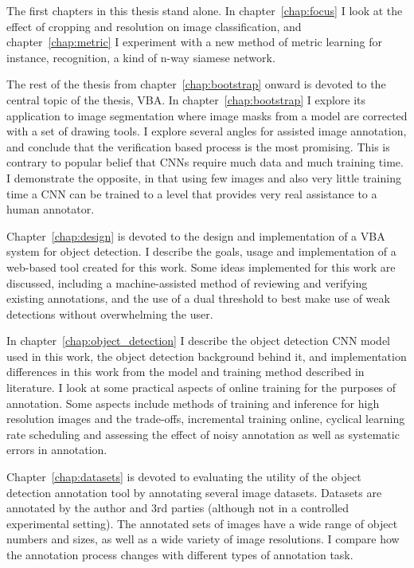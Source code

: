 The first chapters in this thesis stand alone. In chapter~\ref{chap:focus} I look at the effect of cropping and resolution on image classification, and chapter~\ref{chap:metric} I experiment with a new method of metric learning for instance, recognition, a kind of n-way siamese network. 

The rest of the thesis from chapter~\ref{chap:bootstrap} onward is devoted to the central topic of the thesis, \gls{VBA}. In chapter~\ref{chap:bootstrap} I explore its application to image segmentation where image masks from a model are corrected with a set of drawing tools. I explore several angles for assisted image annotation, and conclude that the verification based process is the most promising. This is contrary to popular belief that \gls{CNN}s require much data and much training time. I demonstrate the opposite, in that using few images and also very little training time a \gls{CNN} can be trained to a level that provides very real assistance to a human annotator. 

Chapter~\ref{chap:design} is devoted to the design and implementation of a \gls{VBA} system for object detection. I describe the goals, usage and implementation of a web-based tool created for this work. Some ideas implemented for this work are discussed, including a machine-assisted method of reviewing and verifying existing annotations, and the use of a dual threshold to best make use of weak detections without overwhelming the user.

In chapter~\ref{chap:object_detection} I describe the object detection \gls{CNN} model used in this work, the object detection background behind it, and implementation differences in this work from the model and training method described in literature. I look at some practical aspects of online training for the purposes of annotation. Some aspects include methods of training and inference for high resolution images and the trade-offs, incremental training online, cyclical learning rate scheduling and assessing the effect of noisy annotation as well as systematic errors in annotation. 

Chapter~\ref{chap:datasets} is devoted to evaluating the utility of the object detection annotation tool by annotating several image datasets. Datasets are annotated by the author and 3rd parties (although not in a controlled experimental setting). The annotated sets of images have a wide range of object numbers and sizes, as well as a wide variety of image resolutions. I compare how the annotation process changes with different types of annotation task. 

